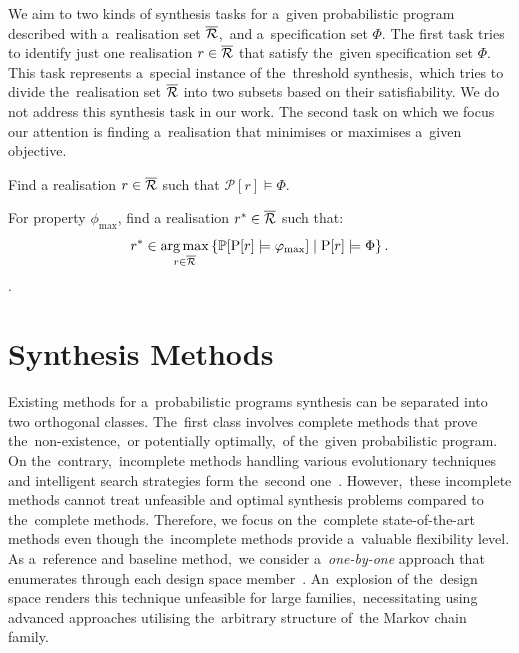 We aim to two kinds of synthesis tasks for a~given probabilistic program described with a~realisation set $\overline{\mathcal{R}}$,~and a~specification set $\Phi$.
The first task tries to identify just one realisation $r \in \overline{\mathcal{R}}$ that satisfy the~given specification set $\Phi$.
This task represents a~special instance of the~threshold synthesis,~which tries to divide the~realisation set $\overline{\mathcal{R}}$ into two subsets based on their satisfiability.
We do not address this synthesis task in our work.
The second task on which we focus our attention is finding a~realisation that minimises or maximises a~given objective.

\begin{definition}[Feasibility]
Find a realisation $r \in \overline{\mathcal{R}}$ such that $\mathcal{P}[r] \models \Phi$. 
\end{definition}

\begin{definition}[Minimality]
For property $\phi_{\max}$, find a realisation $r^* \in \overline{\mathcal{R}}$ such that:
$$r^* \in \operatorname*{arg\,max}_{r \in \overline{\mathcal{R}}} \left \{ \mathbb{P}[\mathrm{P}[r] \models \varphi_{\max}] \mid \mathrm{P}[r] \models \Phi \right \}.$$.
\end{definition}

\section{Synthesis Methods}
Existing methods for a~probabilistic programs synthesis can be separated into two orthogonal classes.
The~first class involves complete methods that prove the~non-existence,~or potentially optimally,~of the~given probabilistic program.
On the~contrary,~incomplete methods handling various evolutionary techniques and intelligent search strategies form the~second one~\cite{spl2}.
However,~these incomplete methods cannot treat unfeasible and optimal synthesis problems compared to the~complete methods.
Therefore, we focus on the~complete state-of-the-art methods even though the~incomplete methods provide a~valuable flexibility level.
As a~reference and baseline method,~we consider a~\textit{one-by-one} approach that enumerates through each design space member~\cite{onebyone}.
An~explosion of the~design space renders this technique unfeasible for large families,~necessitating using advanced approaches utilising the~arbitrary structure of~the Markov chain family.

